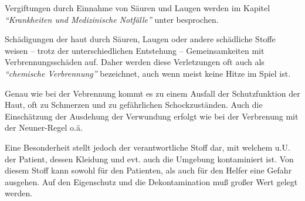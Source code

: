 Vergiftungen durch Einnahme von Säuren und Laugen werden im
Kapitel \emph{"`Krankheiten und Medizinische Notfälle"'}
unter  besprochen. 

Schädigungen der haut durch Säuren, Laugen oder andere schädliche Stoffe weisen
-- trotz der unterschiedlichen Entstehung -- Gemeinsamkeiten mit
Verbrennungsschäden auf. Daher werden diese Verletzungen oft auch als
\emph{"`chemische Verbrennung"'} bezeichnet, auch wenn meist keine Hitze im
Spiel ist.  

Genau wie bei der Vebrennung kommt es zu einem Ausfall der Schutzfunktion der
Haut, oft zu Schmerzen und zu gefährlichen Schockzuständen. Auch die
Einschätzung der Ausdehung der Verwundung erfolgt wie bei der Verbrenung mit
der Neuner-Regel o.ä. 

Eine Besonderheit stellt jedoch der verantwortliche Stoff dar, mit welchem u.U.
der Patient, dessen Kleidung und evt. auch die Umgebung kontaminiert ist. Von
diesem Stoff kann sowohl für den Patienten, als auch für den Helfer eine Gefahr
ausgehen. Auf den Eigenschutz und die Dekontamination muß großer Wert gelegt
werden. 

